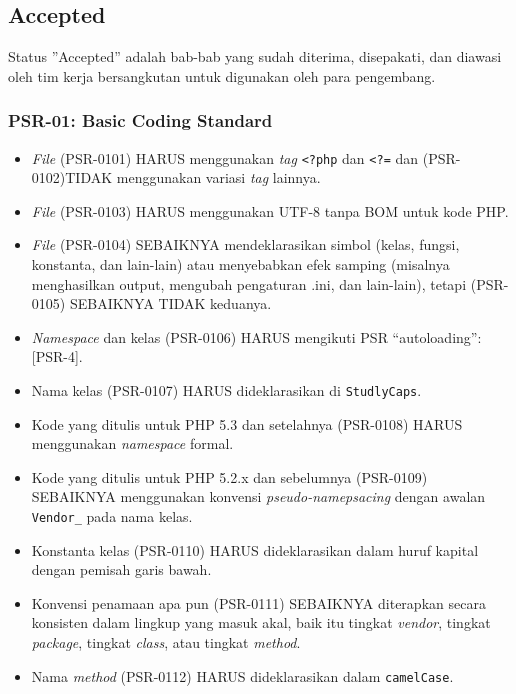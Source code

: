 \subsection{Accepted}
\label{subsec:accepted}
Status ''Accepted'' adalah bab-bab yang sudah diterima, disepakati, dan diawasi oleh tim kerja bersangkutan untuk digunakan oleh para pengembang.

\subsubsection{PSR-01: Basic Coding Standard}
\label{subsubsec:psr01}
\begin{itemize}
	\item \textit{File} (PSR-0101) HARUS menggunakan \textit{tag} \verb|<?php|  dan \verb|<?=| dan (PSR-0102)TIDAK menggunakan variasi \textit{tag} lainnya.
	\item \textit{File} (PSR-0103) HARUS menggunakan UTF-8 tanpa BOM untuk kode PHP.
	\item \textit{File} (PSR-0104) SEBAIKNYA mendeklarasikan simbol (kelas, fungsi, konstanta, dan lain-lain) atau menyebabkan efek samping (misalnya menghasilkan output, mengubah pengaturan .ini, dan lain-lain), tetapi (PSR-0105) SEBAIKNYA TIDAK keduanya.
	\item \textit{Namespace} dan kelas (PSR-0106) HARUS mengikuti PSR ``autoloading'': [PSR-4].
	\item Nama kelas (PSR-0107) HARUS dideklarasikan di \verb|StudlyCaps|.
	\item Kode yang ditulis untuk PHP 5.3 dan setelahnya (PSR-0108) HARUS menggunakan \textit{namespace} formal.
	\item Kode yang ditulis untuk PHP 5.2.x dan sebelumnya (PSR-0109) SEBAIKNYA menggunakan konvensi \textit{pseudo-namepsacing} dengan awalan  \verb|Vendor_|  pada nama kelas.
	\item Konstanta kelas (PSR-0110) HARUS dideklarasikan dalam huruf kapital dengan pemisah garis bawah.
	\item Konvensi penamaan apa pun (PSR-0111) SEBAIKNYA diterapkan secara konsisten dalam lingkup yang masuk akal, baik itu tingkat \textit{vendor}, tingkat \textit{package}, tingkat \textit{class}, atau tingkat \textit{method}.
	\item Nama \textit{method} (PSR-0112) HARUS dideklarasikan dalam \verb|camelCase|.
\end{itemize}

